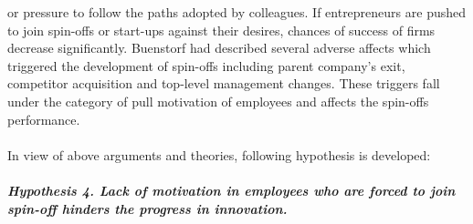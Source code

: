 or pressure to follow the paths adopted by colleagues. If entrepreneurs are pushed to join spin-offs
or start-ups against their desires, chances of success of firms decrease significantly. Buenstorf \cite{28}
had described several adverse affects which triggered the development of spin-offs including parent
company's exit, competitor acquisition and top-level management changes. These triggers fall under the category of
pull motivation of employees and affects the spin-offs performance.
\\
\\
In view of above arguments and theories, following hypothesis is developed:
\\
\\
\textbf{\textit{Hypothesis 4. Lack of motivation in employees who are forced to join spin-off hinders the
progress in innovation.}}



